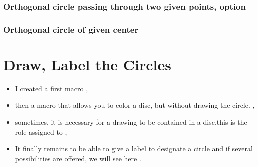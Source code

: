 \subsubsection{Orthogonal circle passing through two given points, option }

\begin{tkzexample}[latex=7cm,small]
\end{tkzexample}

\subsubsection{Orthogonal circle of given center}

\begin{tkzexample}[latex=7cm,small]
\end{tkzexample}

\newpage

\section{Draw, Label the Circles}

\begin{itemize}
\item I created a first macro  ,

\item then a macro that allows you to color a disc, but without drawing the
circle. ,

\item sometimes, it is necessary for a drawing to be contained in a disc,this
is the role assigned to ,

\item It finally remains to be able to give a label to designate a circle and
if several possibilities are offered, we will see here
.
\end{itemize}

